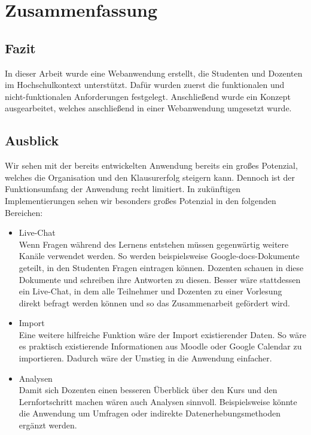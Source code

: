 \chapter{Zusammenfassung}

\section{Fazit} %
In dieser Arbeit wurde eine Webanwendung erstellt, die Studenten und Dozenten im Hochschulkontext unterstützt.
Dafür wurden zuerst die funktionalen und nicht-funktionalen Anforderungen festgelegt.
Anschließend wurde ein Konzept ausgearbeitet, welches anschließend in einer Webanwendung umgesetzt wurde.



\section{Ausblick}
Wir sehen mit der bereits entwickelten Anwendung bereits ein großes Potenzial, welches die Organisation und den Klausurerfolg steigern kann.
Dennoch ist der Funktionsumfang der Anwendung recht limitiert.
In zukünftigen Implementierungen sehen wir besonders großes Potenzial in den folgenden Bereichen:
\begin{itemize}
    \item Live-Chat\\
        Wenn Fragen während des Lernens entstehen müssen gegenwärtig weitere Kanäle verwendet werden.
        So werden beispielsweise Google-docs-Dokumente geteilt, in den Studenten Fragen eintragen können.
        Dozenten schauen in diese Dokumente und schreiben ihre Antworten zu diesen.
        Besser wäre stattdessen ein Live-Chat, in dem alle Teilnehmer und Dozenten zu einer Vorlesung direkt befragt werden können und so das Zusammenarbeit gefördert wird.
    \item Import\\
        Eine weitere hilfreiche Funktion wäre der Import existierender Daten.
        So wäre es praktisch existierende Informationen aus Moodle oder Google Calendar zu importieren.
        Dadurch wäre der Umstieg in die Anwendung einfacher. 
    \item Analysen\\
        Damit sich Dozenten einen besseren Überblick über den Kurs und den Lernfortschritt machen wären auch Analysen sinnvoll.
        Beispielsweise könnte die Anwendung um Umfragen oder indirekte Datenerhebungsmethoden ergänzt werden.
\end{itemize}

